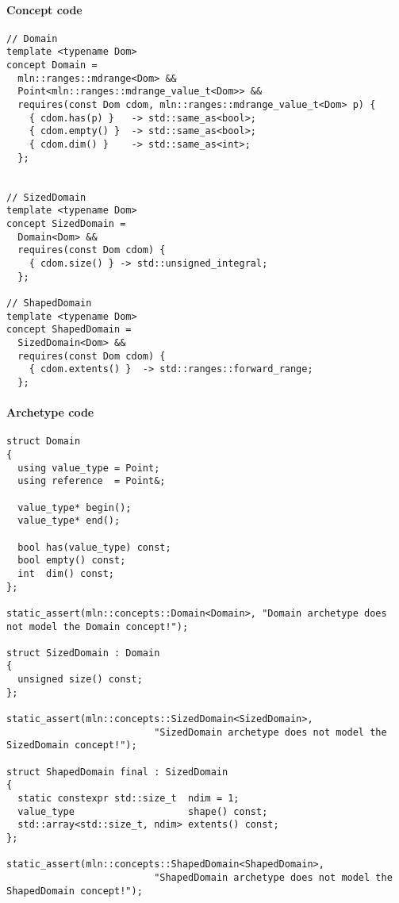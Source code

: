 \paragraph{Concept code}

\begin{verbatim}
// Domain
template <typename Dom>
concept Domain =
  mln::ranges::mdrange<Dom> &&
  Point<mln::ranges::mdrange_value_t<Dom>> &&
  requires(const Dom cdom, mln::ranges::mdrange_value_t<Dom> p) {
    { cdom.has(p) }   -> std::same_as<bool>;
    { cdom.empty() }  -> std::same_as<bool>;
    { cdom.dim() }    -> std::same_as<int>;
  };


// SizedDomain
template <typename Dom>
concept SizedDomain =
  Domain<Dom> &&
  requires(const Dom cdom) {
    { cdom.size() } -> std::unsigned_integral;
  };

// ShapedDomain
template <typename Dom>
concept ShapedDomain =
  SizedDomain<Dom> &&
  requires(const Dom cdom) {
    { cdom.extents() }  -> std::ranges::forward_range;
  };
\end{verbatim}

\paragraph{Archetype code}

\begin{verbatim}
struct Domain
{
  using value_type = Point;
  using reference  = Point&;

  value_type* begin();
  value_type* end();

  bool has(value_type) const;
  bool empty() const;
  int  dim() const;
};

static_assert(mln::concepts::Domain<Domain>, "Domain archetype does not model the Domain concept!");

struct SizedDomain : Domain
{
  unsigned size() const;
};

static_assert(mln::concepts::SizedDomain<SizedDomain>,
                          "SizedDomain archetype does not model the SizedDomain concept!");

struct ShapedDomain final : SizedDomain
{
  static constexpr std::size_t  ndim = 1;
  value_type                    shape() const;
  std::array<std::size_t, ndim> extents() const;
};

static_assert(mln::concepts::ShapedDomain<ShapedDomain>,
                          "ShapedDomain archetype does not model the ShapedDomain concept!");
\end{verbatim}



